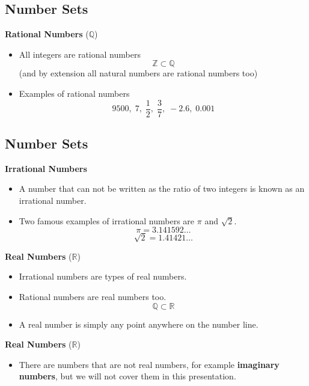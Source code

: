\documentclass[11pt,a4paper,titlepage,oneside,openany]{article}
\numberwithin{equation}{section}
\numberwithin{algorithm}{section}
\numberwithin{figure}{section}
\numberwithin{table}{section}
\begin{document}
{%

\subsection{Number Sets}

\textbf{Rational Numbers} ($\mathbb{Q}$)
\begin{itemize}
\item All integers are rational numbers 
\[ \mathbb{Z}  \subset \mathbb{Q}\]
(and by extension all natural numbers are rational numbers too)
\item Examples of rational numbers
\[ 9500,\;7,\; \frac{1}{2} ,\; \frac{3}{7},\; -2.6 ,\; 0.001\] 
\end{itemize}


\subsection{Number Sets}

\textbf{Irrational Numbers} 
\begin{itemize}
\item A number that can not be written as the ratio of two integers is known as an irrational number.
\item Two famous examples of irrational numbers are $\pi$ and $\sqrt{2}$. 
\[\pi = 3.141592\ldots\]
\[\sqrt{2} = 1.41421\ldots\]
\end{itemize}


\textbf{Real Numbers} ($\mathbb{R}$)
\begin{itemize}
\item Irrational numbers are types of real numbers.
\item Rational numbers are real numbers too.
\[ \mathbb{Q}  \subset \mathbb{R}\]

\item A real number is simply any point anywhere on the number line.
\end{itemize}


\textbf{Real Numbers} ($\mathbb{R}$)
\begin{itemize}
\item There are numbers that are not real numbers, for example \textbf{imaginary numbers}, but we will not cover them in this presentation.
\end{itemize}

}
\end{document}
